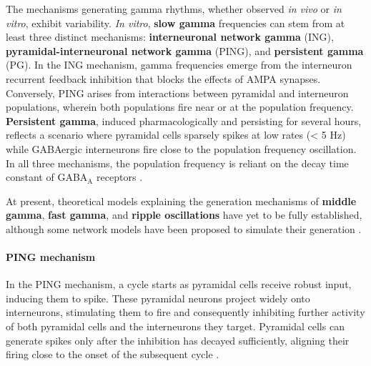 \documentclass[../main.tex]{subfiles}
\begin{document}
The mechanisms generating gamma rhythms, whether observed \textit{in vivo} or \textit{in vitro}, exhibit variability.
\textit{In vitro}, \textbf{slow gamma} frequencies can stem from at least three distinct mechanisms: \textbf{interneuronal network gamma} (ING), \textbf{pyramidal-interneuronal network gamma} (PING), and \textbf{persistent gamma} (PG).
In the ING mechanism, gamma frequencies emerge from the interneuron recurrent feedback inhibition that blocks the effects of AMPA synapses.
Conversely, PING arises from interactions between pyramidal and interneuron populations, wherein both populations fire near or at the population frequency.
\textbf{Persistent gamma}, induced pharmacologically and persisting for several hours, reflects a scenario where pyramidal cells sparsely spikes at low rates (< 5 Hz) while GABAergic interneurons fire close to the population frequency oscillation.
In all three mechanisms, the population frequency is reliant on the decay time constant of GABA$_{\text{A}}$ receptors \citep{traub1996analysis, borgers_effects_2005}.

At present, theoretical models explaining the generation mechanisms of \textbf{middle gamma}, \textbf{fast gamma}, and \textbf{ripple oscillations} have yet to be fully established, although some network models have been proposed to simulate their generation \citep{taxidis2012modeling,jahnke2015unified,omura2015lognormal}.
\paragraph{PING mechanism}
In the PING mechanism, a cycle starts as pyramidal cells receive robust input, inducing them to spike.
These pyramidal neurons project widely onto interneurons, stimulating them to fire and consequently inhibiting further activity of both pyramidal cells and the interneurons they target. 
Pyramidal cells can generate spikes only after the inhibition has decayed sufficiently, aligning their firing close to the onset of the subsequent cycle \citep{jaeger_hippocampal_2013}.
\end{document}
